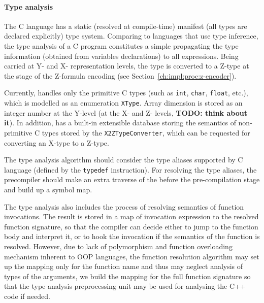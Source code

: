 \paragraph{Type analysis}
\label{ch:impl:proc:x-pre-compiler:type}

The C language has a static (resolved at compile-time) manifest (all types are declared explicitly) type system.
Comparing to languages that use type inference, the type analysis of a C program constitutes a simple propagating the type information (obtained from variables declarations) to all expressions. %
Being carried at Y- and X- representation levels, the type is converted to a Z-type at the stage of the Z-formula encoding (see Section~\ref{ch:impl:proc:z-encoder}).

Currently, \porthos[2] handles only the primitive C types (such as \texttt{int}, \texttt{char}, \texttt{float}, etc.), which is modelled as an enumeration \texttt{XType}. %
Array dimension is stored as an integer number at the Y-level (at the X- and Z- levels, \textbf{TODO: think about it}). %
In addition, \porthos[2] has a built-in extensible database storing the semantics of non-primitive C types stored by the \texttt{X2ZTypeConverter}, %
which can be requested for converting an X-type to a Z-type. %


The type analysis algorithm should consider the type aliases supported by C language (defined by the \texttt{typedef} instruction).
For resolving the type aliases, the precompiler should make an extra traverse of the \ytree{} before the pre-compilation stage and build up a symbol map.

The type analysis also includes the process of resolving semantics of function invocations.
The result is stored in a map of invocation expression to the resolved function signature, so that the compiler can decide either to jump to the function body and interpret it, or to hook the invocation if the semantics of the function is resolved.
However, due to lack of polymorphism and function overloading mechanism inherent to OOP languages, the function resolution algorithm may set up the mapping only for the function name and thus may neglect analysis of types of the arguments, we build the mapping for the full function signature so that the type analysis preprocessing unit may be used for analysing the C++ code if needed.

